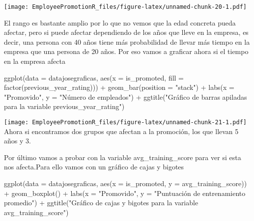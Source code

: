 \documentclass[
]{article}
\newenvironment{Shaded}{\begin{snugshade}}{\end{snugshade}}
\newcommand{\AttributeTok}[1]{\textcolor[rgb]{0.77,0.63,0.00}{#1}}
\newcommand{\FunctionTok}[1]{\textcolor[rgb]{0.00,0.00,0.00}{#1}}
\newcommand{\NormalTok}[1]{#1}
\newcommand{\SpecialCharTok}[1]{\textcolor[rgb]{0.00,0.00,0.00}{#1}}
\newcommand{\StringTok}[1]{\textcolor[rgb]{0.31,0.60,0.02}{#1}}
\begin{document}
\texttt{[image: EmployeePromotionR\_files/figure-latex/unnamed-chunk-20-1.pdf]}

El rango es bastante amplio por lo que no vemos que la edad concreta
pueda afectar, pero si puede afectar dependiendo de los años que lleve
en la empresa, es decir, una persona con 40 años tiene más probabilidad
de llevar más tiempo en la empresa que una persona de 20 años. Por eso
vamos a graficar ahora si el tiempo en la empresa afecta

\begin{Shaded}
\begin{Highlighting}[]
\FunctionTok{ggplot}\NormalTok{(}\AttributeTok{data =}\NormalTok{ datajosegraficas, }\FunctionTok{aes}\NormalTok{(}\AttributeTok{x =}\NormalTok{ is\_promoted, }\AttributeTok{fill =} \FunctionTok{factor}\NormalTok{(previous\_year\_rating))) }\SpecialCharTok{+}
  \FunctionTok{geom\_bar}\NormalTok{(}\AttributeTok{position =} \StringTok{"stack"}\NormalTok{) }\SpecialCharTok{+}
  \FunctionTok{labs}\NormalTok{(}\AttributeTok{x =} \StringTok{"Promovido"}\NormalTok{, }\AttributeTok{y =} \StringTok{"Número de empleados"}\NormalTok{) }\SpecialCharTok{+}
  \FunctionTok{ggtitle}\NormalTok{(}\StringTok{"Gráfico de barras apiladas para la variable \textquotesingle{}previous\_year\_rating\textquotesingle{}"}\NormalTok{) }
\end{Highlighting}
\end{Shaded}

\texttt{[image: EmployeePromotionR\_files/figure-latex/unnamed-chunk-21-1.pdf]}
Ahora si encontramos dos grupos que afectan a la promoción, los que
llevan 5 años y 3.

Por último vamos a probar con la variable avg\_training\_score para ver
si esta nos afecta.Para ello vamos con un gráfico de cajas y bigotes

\begin{Shaded}
\begin{Highlighting}[]
\FunctionTok{ggplot}\NormalTok{(}\AttributeTok{data =}\NormalTok{ datajosegraficas, }\FunctionTok{aes}\NormalTok{(}\AttributeTok{x =}\NormalTok{ is\_promoted, }\AttributeTok{y =}\NormalTok{ avg\_training\_score)) }\SpecialCharTok{+}
  \FunctionTok{geom\_boxplot}\NormalTok{() }\SpecialCharTok{+}
  \FunctionTok{labs}\NormalTok{(}\AttributeTok{x =} \StringTok{"Promovido"}\NormalTok{, }\AttributeTok{y =} \StringTok{"Puntuación de entrenamiento promedio"}\NormalTok{) }\SpecialCharTok{+}
  \FunctionTok{ggtitle}\NormalTok{(}\StringTok{"Gráfico de cajas y bigotes para la variable \textquotesingle{}avg\_training\_score\textquotesingle{}"}\NormalTok{)}
\end{Highlighting}
\end{Shaded}
\end{document}
